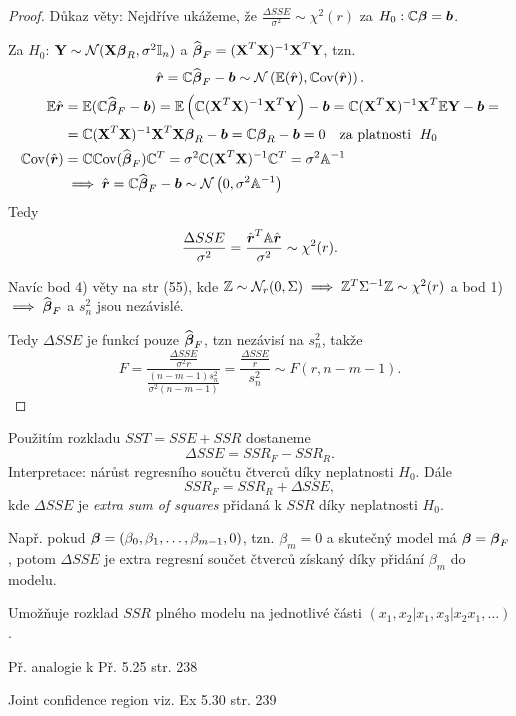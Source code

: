 \begin{proof}
Důkaz věty: Nejdříve ukážeme, že $\frac{\Delta SSE}{\sigma^2} \sim \chi^2 (r)$ za $H_0: \mathbb{C}\boldsymbol{\beta} = \boldsymbol{b}$.

Za $H_0$: $\textbf{Y} \sim \mathcal{N}(\textbf{X} \boldsymbol{\beta}_R, \sigma^2 \mathbb{I}_{n})$ a $\widehat{\boldsymbol{\beta}}_F = (\textbf{X}^T \textbf{X})^{-1} \textbf{X}^T \textbf{Y}$, tzn.
$$
\hat{\boldsymbol{r}} = \mathbb{C} \widehat{\boldsymbol{\beta}}_F - \boldsymbol{b} \sim \mathcal{N}\left( \mathbb{E}(\hat{\boldsymbol{r}}), \mathbb{C}\mathrm{ov}(\hat{\boldsymbol{r}}) \right).
$$
\begin{align*}
\mathbb{E} \hat{\boldsymbol{r}} & = \mathbb{E} (\mathbb{C} \widehat{\boldsymbol{\beta}}_F - \boldsymbol{b}) = \mathbb{E} \left( \mathbb{C} (\textbf{X}^T \textbf{X})^{-1} \textbf{X}^T \textbf{Y} \right) - \boldsymbol{b} = \mathbb{C} (\textbf{X}^T \textbf{X})^{-1} \textbf{X}^T \mathbb{E} \textbf{Y} - \boldsymbol{b} = \\
& = \mathbb{C} (\textbf{X}^T \textbf{X})^{-1} \textbf{X}^T \textbf{X} \boldsymbol{\beta}_R - \boldsymbol{b} = \mathbb{C} \boldsymbol{\beta}_R - \boldsymbol{b} = 0 \quad \text{za platnosti \;} H_0 \\
\mathbb{C}\mathrm{ov}(\hat{\boldsymbol{r}}) & = \mathbb{C} \mathbb{C}\mathrm{ov}(\widehat{\boldsymbol{\beta}}_F) \mathbb{C}^T = \sigma^2 \mathbb{C} (\textbf{X}^T \textbf{X})^{-1} \mathbb{C}^T = \sigma^2 \mathbb{A}^{-1} \\
& \implies \hat{\boldsymbol{r}} = \mathbb{C} \widehat{\boldsymbol{\beta}}_F - \boldsymbol{b} \sim \mathcal{N} \left( 0, \sigma^2 \mathbb{A}^{-1} \right)
\end{align*}
Tedy
$$
\frac{\Delta SSE}{\sigma^2} = \frac{\hat{\boldsymbol{r}}^T \mathbb{A} \hat{\boldsymbol{r}}}{\sigma^2} \sim \chi^2(r).
$$

Navíc bod 4) věty na str (55), kde $\mathbb{Z} \sim \mathcal{N}_r(0, \Sigma) \implies \mathbb{Z}^T \Sigma^{-1} \mathbb{Z} \sim \chi^2(r)$ a bod 1) $\implies \widehat{\boldsymbol{\beta}}_F$ a $s_n^2$ jsou nezávislé.

Tedy $\Delta SSE$ je funkcí pouze $\widehat{\boldsymbol{\beta}}_F$, tzn nezávisí na $s_n^2$, takže
$$
F = \frac{\frac{\Delta SSE}{\sigma^2 r}}{\frac{(n-m-1)s_n^2}{\sigma^2(n-m-1)}} = \frac{\frac{\Delta SSE}{r}}{s_n^2} \sim F(r, n-m-1).
$$
\end{proof}

\begin{remark}
Použitím rozkladu $SST = SSE + SSR$ dostaneme
$$
\Delta SSE = SSR_F - SSR_R.
$$
Interpretace: nárůst regresního součtu čtverců díky neplatnosti $H_0$. Dále
$$
SSR_F = SSR_R + \Delta SSE,
$$
kde $\Delta SSE$ je \textit{extra sum of squares} přidaná k $SSR$ díky neplatnosti $H_0$.

Např. pokud $\boldsymbol{\beta} = (\beta_0, \beta_1, \dots, \beta_{m-1}, 0)$, tzn. $\beta_m = 0$ a skutečný model má $\boldsymbol{\beta} = \boldsymbol{\beta}_F$, potom $\Delta SSE$ je extra regresní součet čtverců získaný díky přidání $\beta_m$ do modelu.

Umožňuje rozklad $SSR$ plného modelu na jednotlivé části $\left( x_1, x_2 | x_1, x_3 | x_2 x_1, \dots \right)$.
\end{remark}

Př. analogie k Př. 5.25 str. 238

\begin{remark}
	Joint confidence region viz. Ex 5.30 str. 239
\end{remark}



